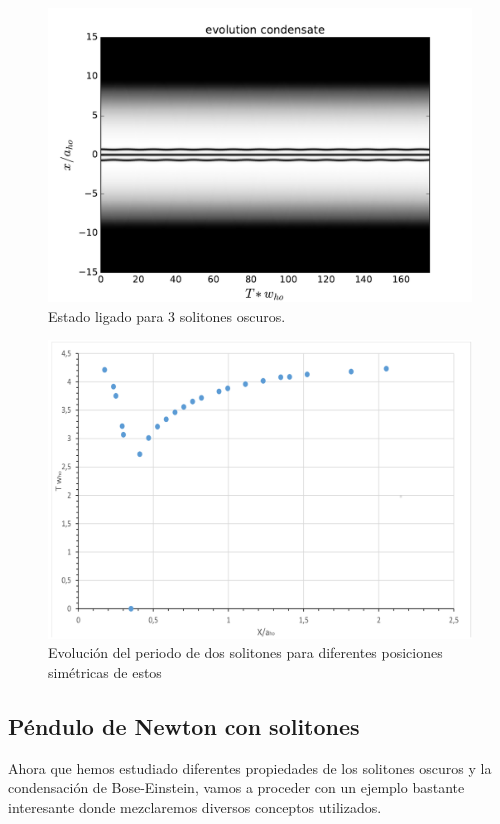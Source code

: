   \begin{figure}[tb]
 	\centering
 	\includegraphics[width=0.9\linewidth]{stati_3.pdf}
 	\caption{Estado ligado para 3 solitones oscuros.}
 	\label{Fig:stati_3}
 \end{figure}
 
 \begin{figure}[tb]
 	\centering
 	\includegraphics[width=0.9\linewidth]{periodo.pdf}
 	\caption{Evoluci\'on del periodo de dos solitones para diferentes posiciones sim\'etricas de estos}
 	\label{Fig:per}
 \end{figure}

\subsection{P\'endulo de Newton con solitones}
Ahora que hemos estudiado diferentes propiedades de los solitones oscuros y la condensaci\'on de Bose-Einstein, vamos a proceder con un ejemplo bastante interesante donde mezclaremos diversos conceptos utilizados.

